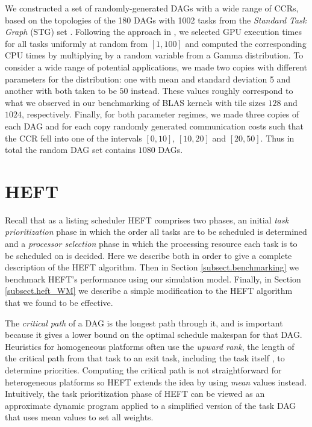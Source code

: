 \documentclass[runningheads]{llncs}
\begin{document}
We constructed a set of randomly-generated DAGs with a wide range of CCRs, based on the topologies of the 180 DAGs with 1002 tasks from the {\em Standard Task Graph} (STG) set \cite{Tobita2002}. Following the approach in \cite{canon2018}, we selected GPU execution times for all tasks uniformly at random from $[1, 100]$ and computed the corresponding CPU times by multiplying by a random variable from a Gamma distribution. To consider a wide range of potential applications, we made two copies with different parameters for the distribution: one with mean and standard deviation 5 and another with both taken to be $50$ instead. These values roughly correspond to what we observed in our benchmarking of BLAS kernels with tile sizes $128$ and $1024$, respectively. Finally, for both parameter regimes, we made three copies of each DAG and for each copy randomly generated communication costs such that the CCR fell into one of the intervals $[0, 10]$, $[10, 20]$ and $[20, 50]$. Thus in total the random DAG set contains $1080$ DAGs.  



\section{HEFT}
\label{sect.HEFT}

Recall that as a listing scheduler HEFT comprises two phases, an initial {\em task prioritization} phase in which the order all tasks are to be scheduled is determined and a {\em processor selection} phase in which the processing resource each task is to be scheduled on is decided. Here we describe both in order to give a complete description of the HEFT algorithm. Then in Section \ref{subsect.benchmarking} we benchmark HEFT's performance using our simulation model. Finally, in Section \ref{subsect.heft_WM} we describe a simple modification to the HEFT algorithm that we found to be effective.      

The {\em critical path} of a DAG is the longest path through it, and is important because it gives a lower bound on the optimal schedule makespan for that DAG. Heuristics for homogeneous platforms often use the {\em upward rank}, the length of the critical path from that task to an exit task, including the task itself \cite{topcuoglu2002performance}, to determine priorities. Computing the critical path is not straightforward for heterogeneous platforms so HEFT extends the idea by using {\em mean} values instead. Intuitively, the task prioritization phase of HEFT can be viewed as an approximate dynamic program applied to a simplified version of the task DAG that uses mean values to set all weights.
\end{document}

